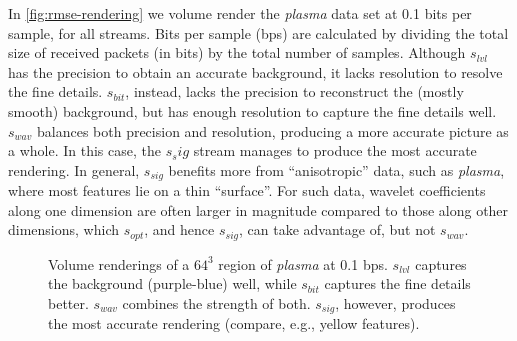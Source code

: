 In \autoref{fig:rmse-rendering} we volume render the \emph{plasma} data set at 0.1 bits per sample,
for all streams. Bits per sample (bps) are calculated by dividing the total size of received packets
(in bits) by the total number of samples. Although $s_{lvl}$ has the precision to obtain an accurate
background, it lacks resolution to resolve the fine details. $s_{bit}$, instead, lacks the precision
to reconstruct the (mostly smooth) background, but has enough resolution to capture the fine details
well. $s_{wav}$ balances both precision and resolution, producing a more accurate picture as a
whole. In this case, the $s_sig$ stream manages to produce the most accurate rendering. In general,
$s_{sig}$ benefits more from ``anisotropic'' data, such as \emph{plasma}, where most features lie on
a thin ``surface''. For such data, wavelet coefficients along one dimension are often larger in
magnitude compared to those along other dimensions, which $s_{opt}$, and hence $s_{sig}$, can take
advantage of, but not $s_{wav}$.

\begin{figure}[t]
	\centering
	 
	  
	 \caption{Volume renderings
	of a $64^3$ region of \emph{plasma} at 0.1 bps. $s_{lvl}$ captures the background (purple-blue)
	well, while $s_{bit}$ captures the fine details better. $s_{wav}$ combines the strength of both.
	$s_{sig}$, however, produces the most accurate rendering (compare, e.g., yellow
	features).}\label{fig:rmse-rendering}
\end{figure}
